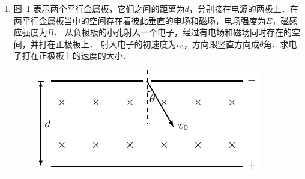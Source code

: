 \begin{enumerate}
\item  图~\ref{fig_C_1-48} 表示两个平行金属板，它们之间的距离为$d$，分别接在电源的两极上．在两平行金属板当中的空间存在着彼此垂直的电场和磁场，电场强度为$E$，磁感应强度为$B$． 从负极板的小孔射入一个电子，经过有电场和磁场同时存在的空间，并打在正极板上．
射入电子的初速度为$v_0$，方向跟竖直方向成$\theta$角．求电子打在正极板上的速度的大小．

\begin{figure}[htbp]
    \centering
    \includegraphics{fig/C/1-48.pdf}
    \caption{}\label{fig_C_1-48}
\end{figure}
\end{enumerate}

